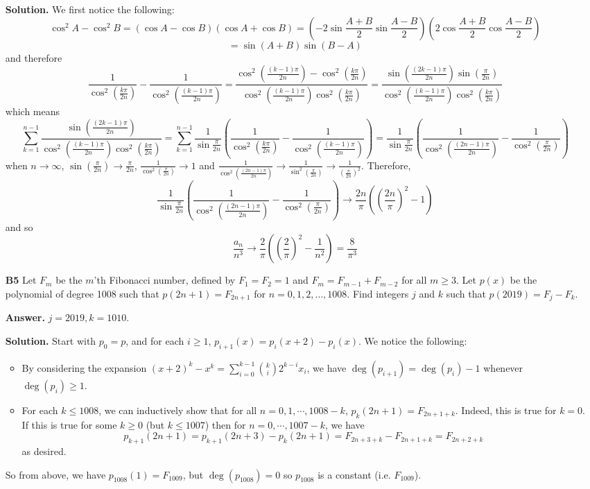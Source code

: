 \documentclass[11pt,a4paper]{article}
\newcommand{\<}{\langle}
\renewcommand{\>}{\rangle}
\begin{document}
\begin{enumerate}
	\textbf{Solution.} We first notice the following: 
	\[
	\cos^2 A - \cos^2B = (\cos A-\cos B)(\cos A+\cos B)=(-2\sin\frac{A+B}{2}\sin\frac{A-B}{2})(2\cos\frac{A+B}{2}\cos\frac{A-B}{2})
	\]
	\[
	=\sin(A+B)\sin(B-A)
	\]
	and therefore 
	\[
	\frac{1}{\cos^2(\frac{k\pi}{2n})}-\frac{1}{\cos^2(\frac{(k-1)\pi}{2n})}
	=\frac{\cos^2(\frac{(k-1)\pi}{2n})-\cos^2(\frac{k\pi}{2n})}{\cos^2(\frac{(k-1)\pi}{2n})\cos^2(\frac{k\pi}{2n})}
	=\frac{\sin(\frac{(2k-1)\pi}{2n})\sin(\frac{\pi}{2n})}{\cos^2(\frac{(k-1)\pi}{2n})\cos^2(\frac{k\pi}{2n})}
	\]
	which means 
	\[
	\sum_{k=1}^{n-1}\frac{\sin(\frac{(2k-1)\pi}{2n})}{\cos^2(\frac{(k-1)\pi}{2n})\cos^2(\frac{k\pi}{2n})}
	=\sum_{k=1}^{n-1}\frac{1}{\sin\frac{\pi}{2n}}(\frac{1}{\cos^2(\frac{k\pi}{2n})}-\frac{1}{\cos^2(\frac{(k-1)\pi}{2n})})
	=\frac{1}{\sin\frac{\pi}{2n}}(\frac{1}{\cos^2(\frac{(2n-1)\pi}{2n})} - \frac{1}{\cos^2(\frac{\pi}{2n})})
	\]
	when $n\to\infty$, $\sin(\frac{\pi}{2n})\to \frac{\pi}{2n}$, $\frac{1}{\cos^2(\frac{\pi}{2n})}\to 1$ and $\frac{1}{\cos^2(\frac{(2n-1)\pi}{2n})}\to \frac{1}{\sin^2(\frac{\pi}{2n})}\to\frac{1}{(\frac{\pi}{2n})^2}$. Therefore, 
	\[
	\frac{1}{\sin\frac{\pi}{2n}}(\frac{1}{\cos^2(\frac{(2n-1)\pi}{2n})} - \frac{1}{\cos^2(\frac{\pi}{2n})})
	\to \frac{2n}{\pi}((\frac{2n}{\pi})^2-1)
	\]
	and so 
	\[
	\frac{a_n}{n^3}\to \frac{2}{\pi}((\frac{2}{\pi})^2-\frac{1}{n^2})=\frac{8}{\pi^3}
	\]
	
	\item [\textbf{B5}] Let $F_m$ be the $m$'th Fibonacci number, defined by $F_1=F_2=1$ and $F_m = F_{m-1}+F_{m-2}$ for all $m \geq 3$. Let $p(x)$ be the polynomial of degree 1008 such that $p(2n+1)=F_{2n+1}$ for $n=0,1,2,\ldots,1008$. Find integers $j$ and $k$ such that $p(2019) = F_j - F_k$.
	
	\textbf{Answer.} $j=2019, k=1010$. 
	
	\textbf{Solution.}
	Start with $p_0=p$, and for each $i\ge 1$, $p_{i+1}(x)=p_{i}(x+2)-p_{i}(x)$. 
	We notice the following: 
	\begin{itemize}
		\item By considering the expansion $(x+2)^k-x^k = \sum_{i=0}^{k-1} \binom{k}{i}2^{k-i}x_i$, we have $\deg(p_{i+1})=\deg(p_i)-1$ whenever $\deg(p_i)\ge 1$. 
		
		\item For each $k\le 1008$, we can inductively show that for all $n=0, 1, \cdots, 1008-k$, 
		$p_k(2n+1)=F_{2n+1+k}$. 
		Indeed, this is true for $k=0$. 
		If this is true for some $k\ge 0$ (but $k\le 1007$) 
		then for $n=0, \cdots, 1007-k$, we have 
		\[
		p_{k+1}(2n+1)=p_{k+1}(2n+3)-p_{k}(2n+1)
		=F_{2n+3+k}-F_{2n+1+k}
		=F_{2n+2+k}
		\]
		as desired. 
	\end{itemize}
	So from above, we have $p_{1008}(1)=F_{1009}$, but $\deg(p_{1008})=0$ so $p_{1008}$ is a constant (i.e. $F_{1009}$). 
	

\end{enumerate}
\end{document}
